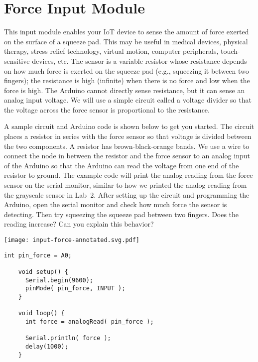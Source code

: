 
\clearpage
\section{Force Input Module}
\label{sec-input-force}

This input module enables your IoT device to sense the amount of force
exerted on the surface of a squeeze pad. This may be useful in medical
devices, physical therapy, stress relief technology, virtual motion,
computer peripherals, touch-sensitive devices, etc. The sensor is a
variable resistor whose resistance depends on how much force is exerted
on the squeeze pad (e.g., squeezing it between two fingers); the
resistance is high (infinite) when there is no force and low when the
force is high.  The Arduino cannot directly sense resistance, but it can
sense an analog input voltage. We will use a simple circuit called a
voltage divider so that the voltage across the force sensor is
proportional to the resistance.

A sample circuit and Arduino code is shown below to get you started.
The circuit places a  resistor in series with the
force sensor so that voltage is divided between the two components. A
 resistor has brown-black-orange bands. We use a wire
to connect the node in between the resistor and the force sensor to an
analog input of the Arduino so that the Arduino can read the voltage
from one end of the  resistor to ground. The example
code will print the analog reading from the force sensor on the serial
monitor, similar to how we printed the analog reading from the grayscale
sensor in Lab~2. After setting up the circuit and programming the
Arduino, open the serial monitor and check how much force the sensor is
detecting. Then try squeezing the squeeze pad between two fingers. Does
the reading increase? Can you explain this behavior?

\vspace{0.1in}
\begin{minipage}[t]{0.49\tw}
  \vspace{0pt}

  \texttt{[image: input-force-annotated.svg.pdf]}
\end{minipage}
\hfill
\begin{minipage}[t]{0.49\tw}
  \vspace{0.1in}
  \begin{Verbatim}[gobble=3,fontsize=\small]
    int pin_force = A0;

    void setup() {
      Serial.begin(9600);
      pinMode( pin_force, INPUT );
    }

    void loop() {
      int force = analogRead( pin_force );

      Serial.println( force );
      delay(1000);
    }
  \end{Verbatim}
\end{minipage}
\vspace{0.1in}


